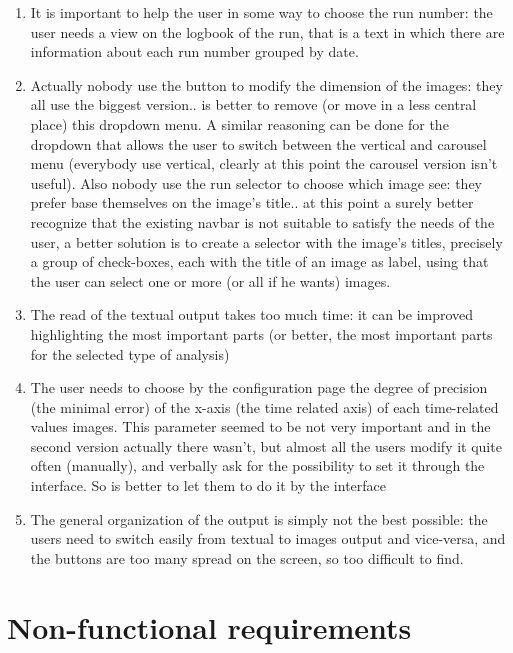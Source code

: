 \begin{enumerate}
\item 
It is important to help the user in some way to choose the run number: the user needs a view on the logbook of the run, that is a text in which there are information about each run number grouped by date.

\item
Actually nobody use the button to modify the dimension of the images: they all use the biggest version.. is better to remove (or move in a less central place) this dropdown menu. A similar reasoning can be done for the dropdown that allows the user to switch between the vertical and carousel menu (everybody use vertical, clearly at this point the carousel version isn't useful). Also nobody use the run selector to choose which image see: they prefer base themselves on the image's title.. at this point a surely better recognize that the existing navbar is not suitable to satisfy the needs of the user, a better solution is to create a selector with the image's titles, precisely a group of check-boxes, each with the title of an image as label, using that the user can select one or more (or all if he wants) images.  

\item
The read of the textual output takes too much time: it can be improved highlighting the most important parts (or better, the most important parts for the selected type of analysis)

\item
The user needs to choose by the configuration page the degree of precision (the minimal error) of the x-axis (the time related axis) of each time-related values images. This parameter seemed to be not very important and in the second version actually there wasn't, but almost all the users modify it quite often (manually), and verbally ask for the possibility to set it through the interface. So is better to let them to do it by the interface

\item
The general organization of the output is simply not the best possible: the users need to switch easily from textual to images output and vice-versa, and the buttons are too many spread on the screen, so too difficult to find.

\end{enumerate}

\section{Non-functional requirements}

